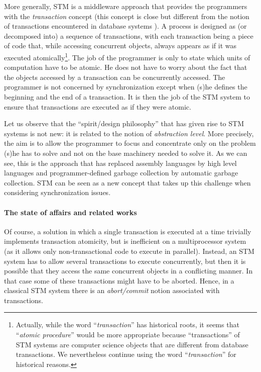 More generally,  STM  is a middleware approach that provides the 
programmers  with the {\it transaction} concept (this concept 
is close but different from the notion of transactions encountered in 
database systems \cite{FFGH08}). A process is designed as 
(or decomposed into)  a sequence of transactions, with each transaction 
being a piece  of code that, while  accessing  concurrent  objects, 
always  appears as if it was  executed atomically\footnote{Actually,  
while the word {``\it transaction}'' has historical roots, it seems that 
{``\it atomic procedure}'' would be more appropriate because 
``transactions''  of STM systems are  computer science objects 
that are different  from database transactions.  We nevertheless 
continue using the word  {``\it transaction}'' for historical reasons.}.
The job of the programmer is only to state which  units of computation
have  to be atomic.  He does not have to worry about the fact that the 
objects accessed by  a transaction can be concurrently accessed. 
The programmer is not concerned by synchronization
except when (s)he defines the beginning and the end of a  transaction.
It  is then the job of the 
STM system to ensure that transactions are executed as if they were atomic. 



Let us observe that  the ``spirit/design philosophy'' that has given 
rise to  STM systems is not new: it is related to the notion of 
{\it abstraction level}.   
More precisely,  the  aim  is   to allow  the programmer  to  focus and
concentrate only  on the problem  (s)he has to
solve and not on the base machinery needed to solve it. 
As we can see, this is the approach  that  has   replaced assembly languages  
by  high level languages and programmer-defined garbage collection 
by automatic garbage collection.   STM can  be seen as a  new concept
that takes  up  this challenge when considering synchronization issues. 


\paragraph{The state of affairs and  related works}
Of course, a solution in which a single transaction is executed at a time 
trivially implements transaction atomicity, but is inefficient
on a multiprocessor system (as it allows only non-transactional code 
 to execute in parallel).   Instead, an STM system has to allow 
several transactions to execute  concurrently, but then it is possible that
they access the same concurrent objects in a conflicting manner.
In that case
some  of  these  transactions might  have  to   be  aborted. Hence,  in  a
classical  STM system    there    is  an    {\it   abort/commit}    notion
associated   with transactions. 









